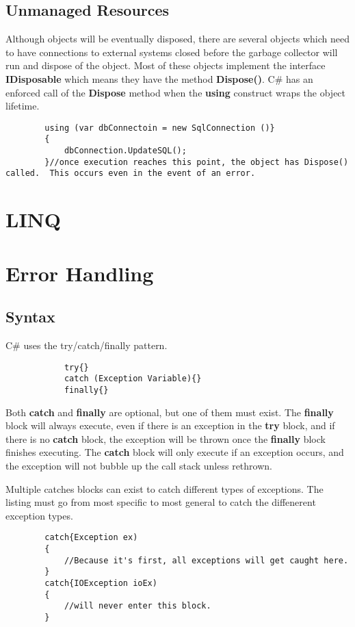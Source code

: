 \documentclass {amsart}
\begin{document}
	\subsection{Unmanaged Resources}  Although objects will be eventually disposed, there are several objects which need to have connections to external systems closed before the garbage collector will run and dispose of the object.  Most of these objects implement the interface {\bf IDisposable} which means they have the method {\bf Dispose()}.  C\#  has an enforced call of the {\bf Dispose} method when the {\bf using} construct wraps the object lifetime.  
	\begin{lstlisting}
		using (var dbConnectoin = new SqlConnection ()}
		{
			dbConnection.UpdateSQL();
		}//once execution reaches this point, the object has Dispose() called.  This occurs even in the event of an error.  
	\end{lstlisting}

\section{LINQ}

\section{Error Handling}
	\subsection{Syntax}  C\# uses the try/catch/finally pattern.
		\begin{lstlisting}
			try{}
			catch (Exception Variable){}
			finally{}
		\end{lstlisting}
	Both {\bf catch} and {\bf finally} are optional, but one of them must exist.  The {\bf finally} block will always execute, even if there is an exception in the {\bf try} block, and if there is no {\bf catch} block, the exception will be thrown once the {\bf finally} block finishes executing.  The {\bf catch} block will only execute if an exception occurs, and the exception will not bubble up the call stack unless rethrown.  
		
	Multiple catches blocks can exist to catch different types of exceptions.  The listing must go from most specific to most general to catch the diffenerent exception types. 

	\begin{lstlisting}
		catch{Exception ex)
		{
			//Because it's first, all exceptions will get caught here.
		}
		catch{IOException ioEx)
		{
			//will never enter this block. 
		}
	\end{lstlisting}
	
\end{document}
